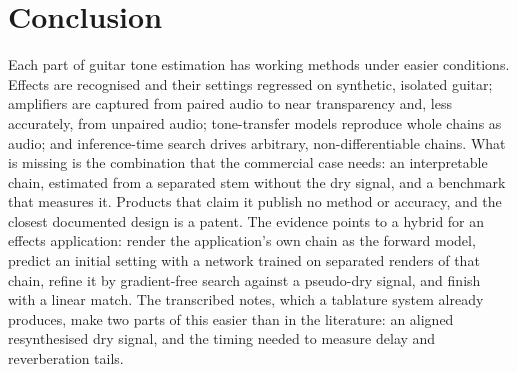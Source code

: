 \section{Conclusion}
\label{sec:conclusion}

Each part of guitar tone estimation has working methods under easier
conditions. Effects are recognised and their settings regressed on synthetic,
isolated guitar; amplifiers are captured from paired audio to near
transparency and, less accurately, from unpaired audio; tone-transfer models
reproduce whole chains as audio; and inference-time search drives arbitrary,
non-differentiable chains. What is missing is the combination that the
commercial case needs: an interpretable chain, estimated from a separated stem
without the dry signal, and a benchmark that measures it. Products that claim
it publish no method or accuracy, and the closest documented design is a
patent. The evidence points to a hybrid for an effects application: render
the application's own chain as the forward model, predict an initial setting
with a network trained on separated renders of that chain, refine it by
gradient-free search against a pseudo-dry signal, and finish with a linear
match. The transcribed notes, which a tablature system already produces, make
two parts of this easier than in the literature: an aligned resynthesised dry
signal, and the timing needed to measure delay and reverberation tails.
